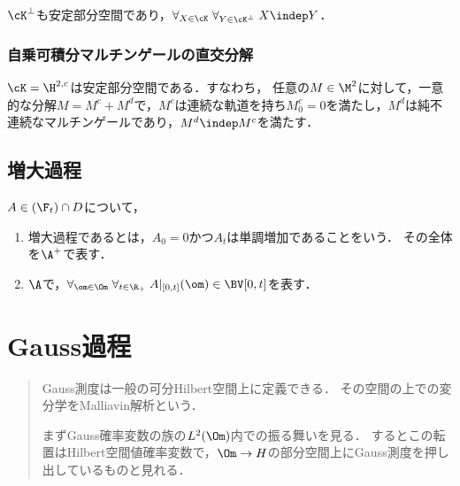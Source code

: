 \documentclass[uplatex,dvipdfmx]{jsreport}
\begin{document}
\begin{theorem}
    $\cK^\perp$も安定部分空間であり，$\forall_{X\in\cK}\;\forall_{Y\in\cK^\perp}\;X\indep Y$．
\end{theorem}

\subsection{自乗可積分マルチンゲールの直交分解}

\begin{tcolorbox}[colframe=ForestGreen, colback=ForestGreen!10!white,breakable,colbacktitle=ForestGreen!40!white,coltitle=black,fonttitle=\bfseries\sffamily,
title=]
    
\end{tcolorbox}

\begin{theorem}
    $\cK=\H^{2,c}$は安定部分空間である．すなわち，
    任意の$M\in\M^2$に対して，一意的な分解$M=M^c+M^d$で，$M^c$は連続な軌道を持ち$M^c_0=0$を満たし，$M^d$は純不連続なマルチンゲールであり，$M^d\indep M^c$を満たす．
\end{theorem}

\section{増大過程}

\begin{definition}
    $A\in(\F_t)\cap D$について，
    \begin{enumerate}
        \item 増大過程であるとは，$A_0=0$かつ$A_t$は単調増加であることをいう．
        その全体を$\A^+$で表す．
        \item $\A$で，$\forall_{\om\in\Om}\;\forall_{t\in\R_+}\;A|_{[0,t]}(\om)\in\BV[0,t]$を表す．
    \end{enumerate}
\end{definition}

\chapter{Gauss過程}

\begin{quotation}
    Gauss測度は一般の可分Hilbert空間上に定義できる．
    その空間の上での変分学をMalliavin解析という．

    まずGauss確率変数の族の$L^2(\Om)$内での振る舞いを見る．
    するとこの転置はHilbert空間値確率変数で，$\Om\to H$の部分空間上にGauss測度を押し出しているものと見れる．
\end{quotation}
\end{document}
